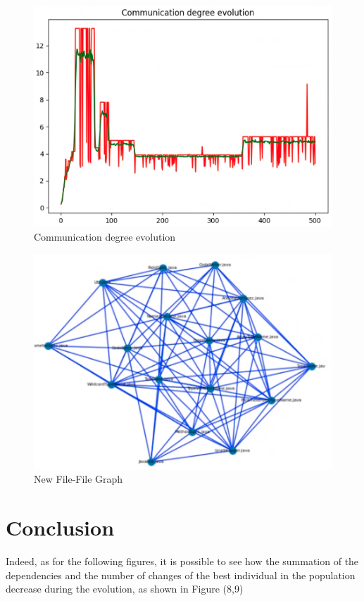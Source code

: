 \documentclass[sigconf]{acmart}
\begin{document}
\begin{figure}[h]
  \centering
  \includegraphics[width=\linewidth]{img_13}
  \caption{Communication degree evolution}
  \Description{}
\end{figure}

\begin{figure}[h]
  \centering
  \includegraphics[width=\linewidth]{img_14}
  \caption{New File-File Graph}
  \Description{}
\end{figure}

\section{Conclusion}
Indeed, as for the following figures, it is possible to see how the summation of the dependencies and the number of changes of the best individual in the population decrease during the evolution, as shown in Figure (8,9)
\end{document}
